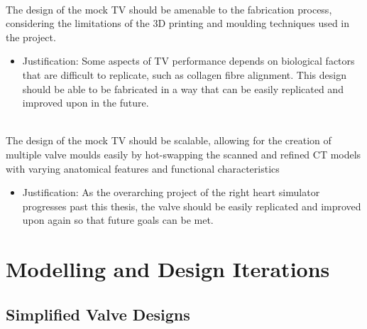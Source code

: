\begin{fullwidth}
    \\ The design of the mock \gls{TV} should be amenable to the fabrication process, considering the limitations of the 3D printing and moulding techniques used in the project.
    \begin{itemize}
        \item Justification: Some aspects of \gls{TV} performance depends on biological factors that are difficult to replicate, such as collagen fibre alignment. This design should be able to be fabricated in a way that can be easily replicated and improved upon in the future.
    \end{itemize}
    \label{sec:Scalability}\\ The design of the mock \gls{TV} should be scalable, allowing for the creation of multiple valve moulds easily by hot-swapping the scanned and refined \gls{CT} models with varying anatomical features and functional characteristics
    \begin{itemize}
        \item Justification: As the overarching project of the right heart simulator progresses past this thesis, the valve should be easily replicated and improved upon again so that future goals can be met.
    \end{itemize}
\end{fullwidth}

\section{Modelling and Design Iterations}

\subsection{Simplified Valve Designs}

